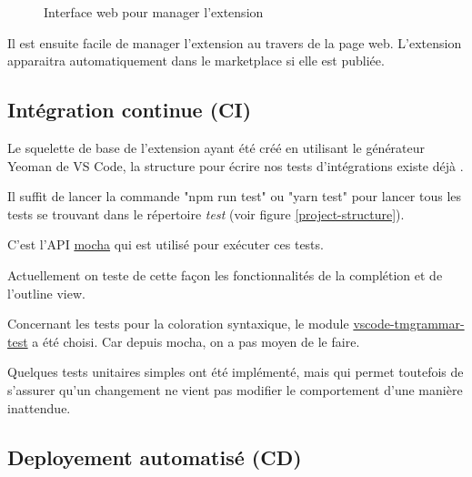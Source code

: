 \documentclass[
    iict, %
    il, %
]{heig-tb}
\begin{document}
\begin{figure}[!h]
    \begin{center}
    \end{center}
    \caption[Interface web pour manager l'extension]{\label{manage-publisher} Interface web pour manager l'extension}
\end{figure}

Il est ensuite facile de manager l'extension au travers de la page web.
L'extension apparaitra automatiquement dans le marketplace si elle est publiée.

\subsection{Intégration continue (CI)}

Le squelette de base de l'extension ayant été créé en utilisant le générateur Yeoman de VS Code, la structure pour écrire nos tests d'intégrations
existe déjà \cite{testing-extension}.

Il suffit de lancer la commande "npm run test" ou "yarn test" pour lancer tous les tests se trouvant dans le répertoire \emph{test} (voir figure \ref{project-structure}).

C'est l'API \href{https://mochajs.org/api/}{mocha} qui est utilisé pour exécuter ces tests.

Actuellement on teste de cette façon les fonctionnalités de la complétion et de l'outline view.

Concernant les tests pour la coloration syntaxique, le module \href{https://www.npmjs.com/package/vscode-tmgrammar-test?activeTab}{vscode-tmgrammar-test} a été choisi.
Car depuis mocha, on a pas moyen de le faire.

Quelques tests unitaires simples ont été implémenté, mais qui permet toutefois de s'assurer qu'un changement ne vient pas modifier le comportement d'une manière inattendue.

\subsection{Deployement automatisé (CD)}
\end{document}
